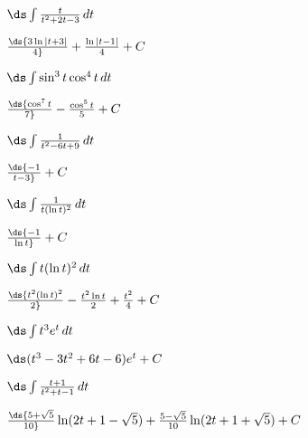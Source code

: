 \begin{exercises}
\exercise $\ds\int {t\over t^2+2t-3}\,dt$
\begin{answer} $\ds{3\ln|t+3|\over 4}+{\ln|t-1|\over4}+C$
\end{answer}

\exercise $\ds\int \sin^3 t\cos^4 t\,dt$
\begin{answer} $\ds{\cos^7 t\over 7}-{\cos^5 t\over 5}+C$
\end{answer}

\exercise $\ds\int {1\over t^2-6t+9}\,dt$
\begin{answer} $\ds{-1\over t-3}+C$
\end{answer}

\exercise $\ds\int {1\over t(\ln t)^2}\,dt$
\begin{answer} $\ds{-1\over \ln t}+C$
\end{answer}

\exercise $\ds\int t(\ln t)^2\,dt$
\begin{answer} $\ds{t^2(\ln t)^2\over 2}-{t^2\ln t\over 2}+{t^2\over4}+C$
\end{answer}

\exercise $\ds\int t^3e^{t}\,dt$
\begin{answer} $\ds(t^3-3t^2+6t-6)e^t+C$
\end{answer}

\exercise $\ds\int {t+1\over t^2+t-1}\,dt$
\begin{answer} $\ds{5+\sqrt5\over10}
\ln(2t+1-\sqrt5)+{5-\sqrt5\over10}\ln(2t+1+\sqrt5)+C$
\end{answer}

\endtwocol
\end{exercises}
